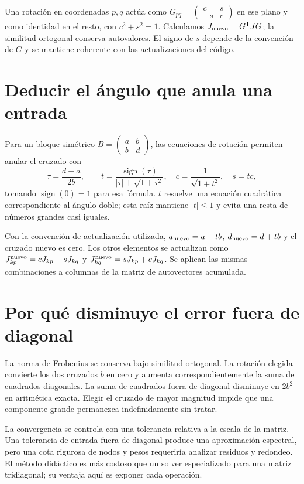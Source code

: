 \documentclass[11pt,a4paper]{article}
\newcommand{\T}{^{\mathsf T}}
\DeclareMathOperator{\sign}{sign}
\theoremstyle{definition}
\begin{document}
Una rotación en coordenadas $p,q$ actúa como
$G_{pq}=\left(\begin{smallmatrix}c&s\\-s&c\end{smallmatrix}\right)$
en ese plano y como identidad en el resto, con $c^2+s^2=1$.
Calculamos $J_{\rm nuevo}=G\T JG$; la similitud ortogonal conserva autovalores.
El signo de $s$ depende de la convención de $G$ y se mantiene coherente con las actualizaciones del código.

\section{Deducir el ángulo que anula una entrada}
Para un bloque simétrico
$B=\left(\begin{smallmatrix}a&b\\b&d\end{smallmatrix}\right)$, las ecuaciones de rotación permiten anular el cruzado con
\[
\tau=\frac{d-a}{2b},\qquad
t=\frac{\sign(\tau)}{|\tau|+\sqrt{1+\tau^2}},
\quad c=\frac1{\sqrt{1+t^2}},\quad s=tc,
\]
tomando $\sign(0)=1$ para esa fórmula.
$t$ resuelve una ecuación cuadrática correspondiente al ángulo doble; esta raíz mantiene $|t|\le1$ y evita una resta de números grandes casi iguales.

Con la convención de actualización utilizada,
$a_{\rm nuevo}=a-tb$, $d_{\rm nuevo}=d+tb$ y el cruzado nuevo es cero.
Los otros elementos se actualizan como
$J_{kp}^{\rm nuevo}=cJ_{kp}-sJ_{kq}$ y
$J_{kq}^{\rm nuevo}=sJ_{kp}+cJ_{kq}$.
Se aplican las mismas combinaciones a columnas de la matriz de autovectores acumulada.

\section{Por qué disminuye el error fuera de diagonal}
La norma de Frobenius se conserva bajo similitud ortogonal.
La rotación elegida convierte los dos cruzados $b$ en cero y aumenta correspondientemente la suma de cuadrados diagonales.
La suma de cuadrados fuera de diagonal disminuye en $2b^2$ en aritmética exacta.
Elegir el cruzado de mayor magnitud impide que una componente grande permanezca indefinidamente sin tratar.

La convergencia se controla con una tolerancia relativa a la escala de la matriz.
Una tolerancia de entrada fuera de diagonal produce una aproximación espectral, pero una cota rigurosa de nodos y pesos requeriría analizar residuos y redondeo.
El método didáctico es más costoso que un solver especializado para una matriz tridiagonal; su ventaja aquí es exponer cada operación.
\end{document}
